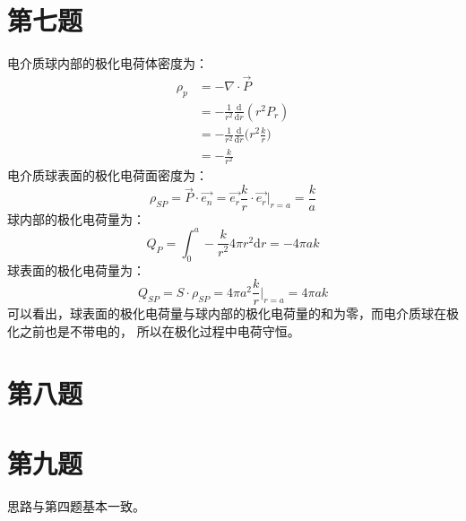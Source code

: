 \documentclass[a4paper]{article}
\begin{document}
	\section{第七题}
		电介质球内部的极化电荷体密度为：
		\begin{equation}
			\begin{split}
				\rho_p &= - \nabla \cdot \vec{P}\\
				&= - \frac{1}{r^2} \frac{\mathrm{d}}{\mathrm{d}r}(r^2 P_r)\\
				&= - \frac{1}{r^2} \frac{\mathrm{d}}{\mathrm{d}r} \bigg( r^2 \frac{k}{r} \bigg)\\
				&= - \frac{k}{r^2}
			\end{split}
		\end{equation}
		电介质球表面的极化电荷面密度为：
		\begin{equation}
			\rho _{SP} = \vec{P} \cdot \vec{e_n} = \vec{e_r} \frac{k}{r} \cdot \vec{e_r}  \bigg | _{r=a} = \frac{k}{a}
		\end{equation}
		球内部的极化电荷量为：
		\begin{equation}
			Q_P = \int _0 ^a -\frac{k}{r^2} 4\pi r^2 \mathrm{d}r = -4\pi ak
		\end{equation}
		球表面的极化电荷量为：
		\begin{equation}
			Q_{SP} = S \cdot \rho _{SP} = 4\pi a^2 \frac{k}{r} \bigg| _{r=a} = 4\pi ak
		\end{equation}
		可以看出，球表面的极化电荷量与球内部的极化电荷量的和为零，而电介质球在极化之前也是不带电的，
		所以在极化过程中电荷守恒。

	\section{第八题}

	\section{第九题}
		思路与第四题基本一致。
\end{document}
